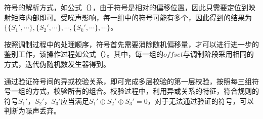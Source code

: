 符号的解析方式，如公式（），由于符号是相对的偏移位置，因此只需要定位到映射矩阵内部即可。受噪声影响，每一组中的符号可能有多个，因此得到的结果为$\{\{S_1',\cdots\},\{S_2',\cdots\},\cdots, \{S_k',\cdots\}, \cdots\}$。

按照调制过程中的处理顺序，符号首先需要消除随机偏移量，才可以进行进一步的鉴别工作，该操作过程如公式（）。其中，每一组的$offset$与调制阶段采用相同的方式，迭代伪随机数发生器得到。

通过验证符号间的异或校验关系，即可完成多层校验的第一层校验，按照每三组符号一组的方式，校验所有的组合。校验过程中，利用异或关系的特征，符合规则的符号$S_1'$，$S_2'$，$S_3'$应当满足$S_1'\oplus S_2'\oplus S_3' = 0$，对于无法通过验证的符号，可以判断为噪声丢弃。